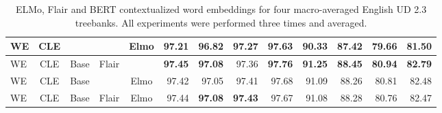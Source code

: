 \documentclass[11pt,a4paper]{article}
\begin{document}
\begin{table*}[t]
\begin{center}
\begin{tabular}{l|c|c|c|c||r|r|r|r|r|r|r|r}
WE & CLE &  &  & Elmo & 97.21 & 96.82 & 97.27 & 97.63 & 90.33 & 87.42 & 79.66 & 81.50\\\hline
\hline
WE & CLE & Base & Flair &  & \bf 97.45 & \bf 97.08 & 97.36 & \bf 97.76 & \bf 91.25 & \bf 88.45 & \bf 80.94 & \bf 82.79\\\hline
WE & CLE & Base &  & Elmo & 97.42 & 97.05 & 97.41 & 97.68 & 91.09 & 88.26 & 80.81 & 82.48\\\hline
WE & CLE & Base & Flair & Elmo & 97.44 & \bf 97.08 & \bf 97.43 & 97.67 & 91.08 & 88.28 & 80.76 & 82.47\\\hline
\end{tabular}
   \end{center}
  \caption{ELMo, Flair and BERT contextualized word embeddings for four
  macro-averaged English UD 2.3 treebanks. All experiments were performed
  three times and averaged.}
  \label{table:elmo}
\end{table*}
\end{document}
